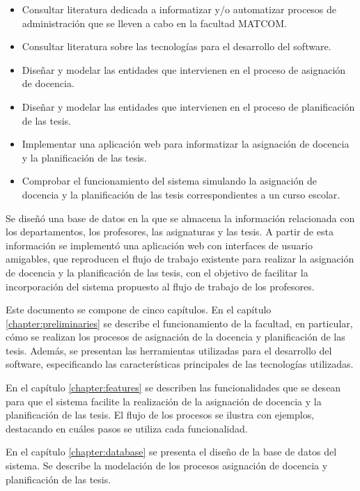 \begin{itemize}
    \item Consultar literatura dedicada a informatizar y/o automatizar procesos de administración
    que se lleven a cabo en la facultad MATCOM. 
    \item Consultar literatura sobre las tecnologías para el desarrollo del software.
    \item Diseñar y modelar las entidades que intervienen en el proceso de asignación de docencia.
    \item Diseñar y modelar las entidades que intervienen en el proceso de planificación de las tesis.
    \item Implementar una aplicación web para informatizar la asignación de docencia y la 
    planificación de las tesis.
    
    \item Comprobar el funcionamiento del sistema simulando la asignación de docencia 
    y la planificación de las tesis correspondientes a un curso escolar. 
\end{itemize}

Se diseñó una base de datos en la que se almacena la información relacionada con los
departamentos, los profesores, las asignaturas y las tesis. A partir de esta información
se implementó una aplicación web con interfaces de usuario amigables, que reproducen el flujo 
de trabajo existente para realizar la asignación de docencia y la planificación de las tesis,
con el objetivo de facilitar la incorporación del sistema propuesto 
al flujo de trabajo de los profesores.

Este documento se compone de cinco capítulos. 
En el capítulo \ref{chapter:preliminaries} se describe el funcionamiento 
de la facultad, en particular, cómo se realizan los procesos de asignación 
de la docencia y planificación de las tesis. Además, se presentan las herramientas 
utilizadas para el desarrollo del software, especificando las características 
principales de las tecnologías utilizadas.

En el capítulo \ref{chapter:features} se describen las funcionalidades que 
se desean para que el sistema facilite la realización de la asignación
de docencia y la planificación de las tesis. 
El flujo de los procesos se ilustra con ejemplos, destacando en 
cuáles pasos se utiliza cada funcionalidad.

En el capítulo \ref{chapter:database} se presenta el diseño de la base 
de datos del sistema. Se describe la modelación de los procesos asignación de docencia y 
planificación de las tesis.

